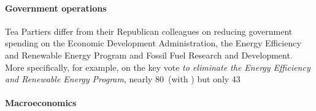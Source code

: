 \paragraph{Government operations}

Tea Partiers differ from their Republican colleagues on reducing
government spending on the Economic Development Administration, the
Energy Efficiency and Renewable Energy Program and Fossil Fuel
Research and Development. More specifically, for example, on the key
vote \textit{to eliminate the Energy Efficiency and Renewable Energy
  Program}, nearly 80\
(with \fw{}) but only 43\










































\paragraph{Macroeconomics}








































